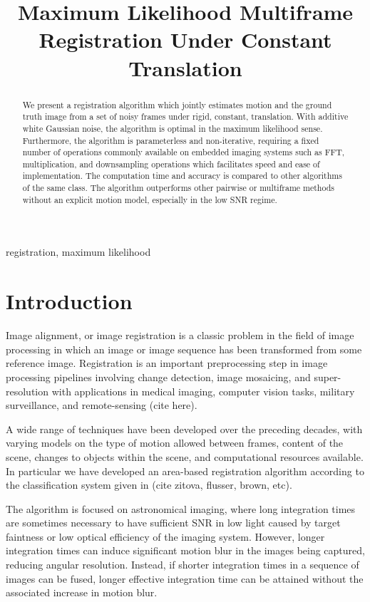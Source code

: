 \documentclass{article}
\title{Maximum Likelihood Multiframe Registration Under Constant Translation}
\begin{document}
%
\maketitle
%
\begin{abstract}
  We present a registration algorithm which jointly estimates motion and the ground truth image from a set of noisy frames under rigid, constant, translation.  With additive white Gaussian noise, the algorithm is optimal in the maximum likelihood sense.  Furthermore, the algorithm is parameterless and non-iterative, requiring a fixed number of operations commonly available on embedded imaging systems such as FFT, multiplication, and downsampling operations which facilitates speed and ease of implementation.  The computation time and accuracy is compared to other algorithms of the same class.  The algorithm outperforms other pairwise or multiframe methods without an explicit motion model, especially in the low SNR regime.
\end{abstract}
%
\begin{keywords}
  registration, maximum likelihood
\end{keywords}
%
%
\section{Introduction}
\label{sec:introduction}

Image alignment, or image registration is a classic problem in the field of image processing in which an image or image sequence has been transformed from some reference image.
Registration is an important preprocessing step in image processing pipelines involving change detection, image mosaicing, and super-resolution with applications in medical imaging, computer vision tasks, military surveillance, and remote-sensing (cite here).

A wide range of techniques have been developed over the preceding decades, with varying models on the type of motion allowed between frames, content of the scene, changes to objects within the scene, and computational resources available.  In particular we have developed an area-based registration algorithm according to the classification system given in (cite zitova, flusser, brown, etc).

The algorithm is focused on astronomical imaging, where long integration times are sometimes necessary to have sufficient SNR in low light caused by target faintness or low optical efficiency of the imaging system.  However, longer integration times can induce significant motion blur in the images being captured, reducing angular resolution.  Instead, if shorter integration times in a sequence of images can be fused, longer effective integration time can be attained without the associated increase in motion blur.
\end{document}
